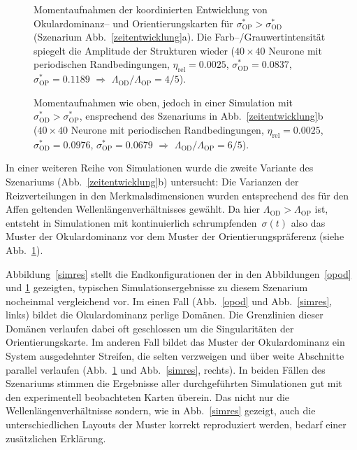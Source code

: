 \begin{figure}[p]
\begin{center}
\begin{sideways}
\end{sideways}
\end{center}
\caption{Momentaufnahmen der koordinierten Entwicklung von Okular\-do\-minanz--
und Orientierungskarten für
$\sigma^\ast_{\text{OP}}>\sigma^\ast_{\text{OD}}$ (Szenarium
Abb.~\ref{zeitentwicklung}a). Die Farb--/Grauwertintensität spiegelt
die Amplitude der Strukturen wieder ($40\times 40$ Neurone mit periodischen
Randbedingungen, $\eta_{\text{rel}}=0.0025$,
$\sigma^\ast_{\text{OD}}=0.0837$, $\sigma^\ast_{\text{OP}}=0.1189$
$\Longrightarrow$ $\Lambda_{\text{OD}}/\Lambda_{\text{OP}}=4/5$).}
\label{opod}

\begin{center}
\begin{sideways}
\end{sideways}
\end{center}
\caption{Momentaufnahmen wie oben, jedoch in einer Simulation mit
$\sigma^\ast_{\text{OD}}>\sigma^\ast_{\text{OP}}$, ensprechend des Szenariums in
Abb.~\ref{zeitentwicklung}b ($40\times 40$ Neurone mit
periodischen Randbedingungen, $\eta_{\text{rel}}= 0.0025$,
$\sigma^\ast_{\text{OD}}=0.0976$, $\sigma^\ast_{\text{OP}}=0.0679$
$\Longrightarrow$ $\Lambda_{\text{OD}}/\Lambda_{\text{OP}}=6/5$).}
\label{odop}
\end{figure}

In einer weiteren Reihe von Simulationen wurde die zweite Variante des
Szenariums (Abb.~\ref{zeitentwicklung}b) untersucht: Die Varianzen der
Reizverteilungen in den Merkmalsdimensionen wurden entsprechend des für
den Affen geltenden Wellen\-längen\-ver\-hältnisses gewählt. Da hier
$\Lambda_{\text{OD}} > \Lambda_{\text{OP}}$ ist, entsteht in Simulationen
mit kontinuierlich schrumpfenden~$\sigma(t)$ also das Muster der
Okulardominanz vor dem Muster der Orientierungspräferenz (siehe
Abb.~\ref{odop}).

Abbildung~\ref{simres} stellt die Endkonfigurationen der in den
Abbildungen~\ref{opod} und \ref{odop} gezeigten, typischen
Simulationsergebnisse zu diesem Szenarium nocheinmal vergleichend vor.  Im
einen Fall (Abb.~\ref{opod} und Abb.~\ref{simres}, links) bildet die
Okulardominanz perlige Domänen. Die Grenzlinien dieser Domänen verlaufen
dabei oft geschlossen um die Singularitäten der Orientierungskarte.  Im
anderen Fall bildet das Muster der Okulardominanz ein System ausgedehnter
Streifen, die selten verzweigen und über weite Abschnitte parallel
verlaufen (Abb.~\ref{odop} und Abb.~\ref{simres}, rechts).
In beiden Fällen des Szenariums stimmen die Ergebnisse aller durchgeführten
Simulationen gut mit den experimentell beobachteten Karten überein. Das
nicht nur die Wellenlängenverhältnisse sondern, wie in Abb.~\ref{simres}
gezeigt, auch die unterschiedlichen Layouts der Muster korrekt reproduziert
werden, bedarf einer zusätzlichen Erklärung.

